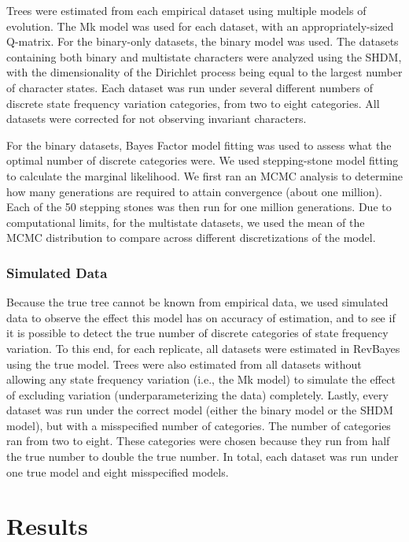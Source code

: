 \documentclass[]{article}
\begin{document}
Trees were estimated from each empirical dataset using multiple models of evolution.
The Mk model was used for each dataset, with an appropriately-sized Q-matrix.
For the binary-only datasets, the binary model was used.
The datasets containing both binary and multistate characters were analyzed using the SHDM, with the dimensionality of the Dirichlet process being equal to the largest number of character states. 
Each dataset was run under several different numbers of discrete state frequency variation categories, from two to eight categories.
All datasets were corrected for not observing invariant characters. \par
For the binary datasets, Bayes Factor model fitting was used to assess what the optimal number of discrete categories were.
We used stepping-stone model fitting to calculate the marginal likelihood.
We first ran an MCMC analysis to determine how many generations are required to attain convergence (about one million).
Each of the 50 stepping stones was then run for one million generations.
Due to computational limits, for the multistate datasets, we used the mean of the MCMC distribution to compare across different discretizations of the model. \par


\subsubsection{Simulated Data}

Because the true tree cannot be known from empirical data, we used simulated data to observe the effect this model has on accuracy of estimation, and to see if it is possible to detect the true number of discrete categories of state frequency variation.
To this end, for each replicate, all datasets were estimated in RevBayes using the true model.
Trees were also estimated from all datasets without allowing any state frequency variation (i.e., the Mk model) to simulate the effect of excluding variation (underparameterizing the data) completely.
Lastly, every dataset was run under the correct model (either the binary model or the SHDM model), but with a misspecified number of categories.
The number of categories ran from two to eight.
These categories were chosen because they run from half the true number to double the true number. 
In total, each dataset was run under one true model and eight misspecified models. \par

\section{Results}
\end{document}
